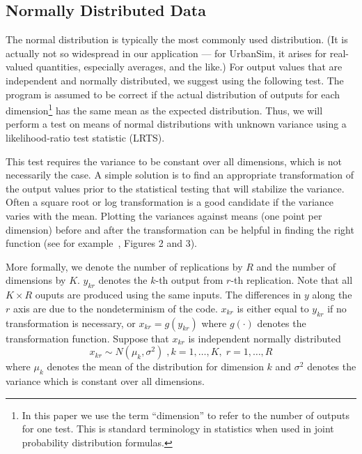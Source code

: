 %
\subsection{Normally Distributed Data}
\label{sec:normal}
%
The normal distribution is typically the most commonly used distribution. (It
is actually not so widespread in our application --- for UrbanSim, it arises
for real-valued quantities, especially averages, and the like.)  For output
values that are independent and normally distributed, we suggest using the
following test.  The program is assumed to be correct if the
actual distribution of outputs for each dimension\footnote{In this paper we
  use the term ``dimension'' to refer to the number of outputs for one test.
  This is standard terminology in statistics when used in joint probability
  distribution formulas.}  has the same mean as the expected distribution.
Thus, we will perform a test on means of normal distributions with unknown
variance using a likelihood-ratio test statistic (LRTS).

This test requires the variance to be constant over all dimensions, which is not
necessarily the case. A simple solution is to find an appropriate
transformation of the output values prior to the statistical testing that will
stabilize the variance. Often a square root or log transformation is a good
candidate if the variance varies with the mean.  Plotting the variances
against means (one point per dimension) before and after the transformation
can be helpful in finding the right function (see for
example~\cite{sevcikova-trb-2006}, Figures 2 and 3).

More formally, we denote the number of replications by $R$ and the number of
dimensions by $K$\@. $y_{kr}$ denotes the $k$-th output from $r$-th
replication.  Note that all $K \times R$ ouputs are produced using the same
inputs. The differences in $y$ along the $r$ axis are due to the
nondeterminism of the code. $x_{kr}$ is either equal to $y_{kr}$ if no
transformation is necessary, or $x_{kr} = g(y_{kr})$ where $g(\cdot)$ denotes
the transformation function.  Suppose that $x_{kr}$ is independent normally
distributed
\[
x_{kr} \sim N(\mu_k, \sigma^2)\;, k=1,\dots, K,\; r=1,\dots,R
\]
where $\mu_k$ denotes the mean of the distribution for dimension $k$
and $\sigma^2$ denotes the variance which is constant over all dimensions.

